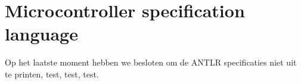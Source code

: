\chapter[Grammar explanation]{Microcontroller specification language}
Op het laatste moment hebben we besloten om de ANTLR specificaties niet
uit te printen, test, test, test.
